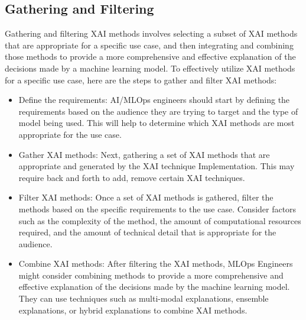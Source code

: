\documentclass[conference]{IEEEtran}
\begin{document}
\subsection{Gathering and Filtering} Gathering and filtering XAI methods involves selecting a subset of XAI methods that are appropriate for a specific use case, and then integrating and combining those methods to provide a more comprehensive and effective explanation of the decisions made by a machine learning model. To effectively utilize XAI methods for a specific use case, here are the steps to gather and filter XAI methods: 
\begin{itemize}
	\item Define the requirements: AI/MLOps engineers should start by defining the requirements based on the audience they are trying to target and the type of model being used. This will help to determine which XAI methods are most appropriate for the use case.
	\item Gather XAI methods: Next, gathering a set of XAI methods that are appropriate and generated by the XAI technique Implementation. This may require back and forth to add, remove certain XAI techniques.
	\item Filter XAI methods: Once a set of XAI methods is gathered, filter the methods based on the specific requirements to the use case. Consider factors such as the complexity of the method, the amount of computational resources required, and the amount of technical detail that is appropriate for the audience.
	\item Combine XAI methods: After filtering the XAI methods, MLOps Engineers might consider combining methods to provide a more comprehensive and effective explanation of the decisions made by the machine learning model. They can use techniques such as multi-modal explanations, ensemble explanations, or hybrid explanations to combine XAI methods.
\end{itemize}
\end{document}

